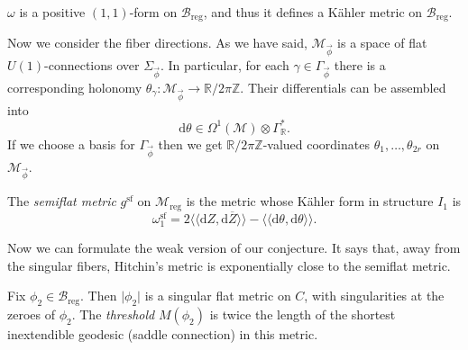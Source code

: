 \documentclass[12pt,letterpaper,reqno]{article}
\numberwithin{equation}{section}
\newcommand{\cB}{\ensuremath{\mathcal B}}
\newcommand{\cM}{\ensuremath{\mathcal M}}
\newcommand{\bbR}{\ensuremath{\mathbb R}}
\newcommand{\bbZ}{\ensuremath{\mathbb Z}}
\newcommand{\bbC}{\ensuremath{\mathbb C}}
\newcommand{\kahler}{K\"ahler\xspace}
\newcommand{\de}{\mathrm{d}}
\newcommand{\reg}{\mathrm{reg}}
\renewcommand{\sf}{\mathrm{sf}}
\newcommand{\gauge}{\mathrm{gauge}}
\newcommand{\abs}[1]{\lvert#1\rvert}
\newcommand{\IP}[1]{\langle#1\rangle}
\newcommand{\DIP}[1]{\langle\!\langle#1\rangle\!\rangle}
\newcommand{\vphi}{{\vec\phi}}
\newcommand{\ti}[1]{\textit{#1}}
\newcommand{\Sp}{\mathrm{Sp}}
\begin{document}
\begin{prop} $\omega$ is a
positive $(1,1)$-form on $\cB_\reg$, and thus it defines
a \kahler metric on $\cB_\reg$.
\end{prop}




Now we consider the fiber directions.
As we have said, $\cM_\vphi$ is a space of flat $U(1)$-connections
over $\Sigma_\vphi$. 
In particular, for each $\gamma \in \Gamma_\vphi$ 
there is a corresponding
holonomy $\theta_\gamma: \cM_\vphi \to \bbR / 2 \pi \bbZ$.
Their differentials can be assembled into
\begin{equation}
  \de \theta \in \Omega^1(\cM) \otimes \Gamma^*_\bbR.
\end{equation}
If we choose a basis for $\Gamma_\vphi$ 
then we get $\bbR / 2 \pi \bbZ$-valued coordinates $\theta_1, \dots, \theta_{2r}$
on $\cM_\vphi$.

\begin{defn}
The \ti{semiflat metric}  $g^\sf$ on $\cM_\reg$ is the metric 
whose \kahler form in structure $I_1$ is
\begin{equation} \label{eq:omega1-sf}
  \omega^\sf_1 = 2 \DIP{\de Z, \de \overline{Z}} - \DIP{\de \theta, \de \theta}.
\end{equation}
\end{defn}                                   

Now we can formulate the weak version of our conjecture.
It says that, away from the singular fibers, Hitchin's
metric is exponentially close to the semiflat metric.

\begin{defn}[Threshold]
Fix $\phi_2 \in \cB_\reg$. Then $\abs{\phi_2}$ is a singular flat metric on $C$, with singularities at the
zeroes of $\phi_2$. The \ti{threshold} $M(\phi_2)$
is twice the length of the shortest inextendible geodesic
(saddle connection) in this metric.
\end{defn}
\end{document}
